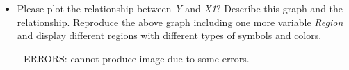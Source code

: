 \documentclass[12pt,letterpaper]{article}
\begin{document}
\begin{itemize}
		\item
		Please plot the relationship between \emph{Y} and \emph{X1}? Describe this graph and the relationship. Reproduce the above graph including one more variable \emph{Region} and display different regions with different types of symbols and colors.
		
		  
		\noindent - ERRORS: cannot produce image due to some errors.
	\end{itemize}
	
	
\end{document}
